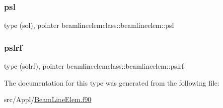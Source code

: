 \subsubsection{\texorpdfstring{psl}{psl}}
{\footnotesize\ttfamily type (sol), pointer beamlineelemclass\+::beamlineelem\+::psl}

\mbox{\label{structbeamlineelemclass_1_1beamlineelem_ae4662d217dff6d83c07fe77d93525c61}} 
\subsubsection{\texorpdfstring{pslrf}{pslrf}}
{\footnotesize\ttfamily type (solrf), pointer beamlineelemclass\+::beamlineelem\+::pslrf}



The documentation for this type was generated from the following file\+:\begin{DoxyCompactItemize}
\item 
src/\+Appl/\mbox{\hyperlink{_beam_line_elem_8f90}{Beam\+Line\+Elem.\+f90}}\end{DoxyCompactItemize}
